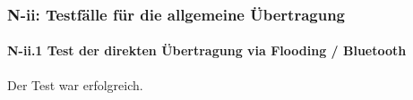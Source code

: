 \subsubsection{N-ii: Testfälle für die allgemeine Übertragung}

\paragraph{N-ii.1 Test der direkten Übertragung via Flooding / Bluetooth}
Der Test war erfolgreich.

%